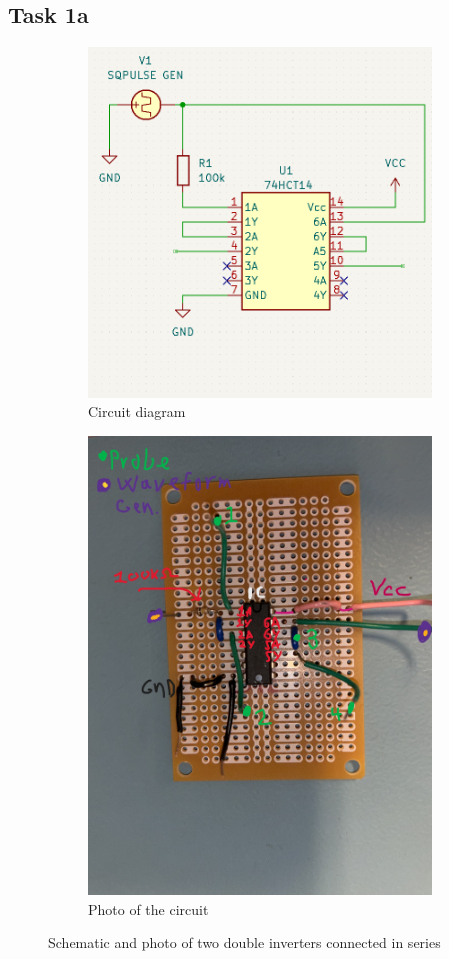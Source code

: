 \documentclass[onecolumn]{article}
\begin{document}
\subsection{Task 1a}

\begin{figure}[h!]
    \centering
    \begin{subfigure}{.5\textwidth}
      \centering
      \includegraphics[width=.78\linewidth]{Task 1 Circuit.png}
      \caption{Circuit diagram}
      \label{fig:sub1}
    \end{subfigure}%
    \begin{subfigure}{.5\textwidth}
      \centering
      \includegraphics[width=.6\linewidth]{Photo of circuit 2.jpg}
      \caption{Photo of the circuit}
      \label{fig:sub2}
    \end{subfigure}
    \caption{Schematic and photo of two double inverters connected in series}
    \label{fig:1}
\end{figure}
\end{document}
